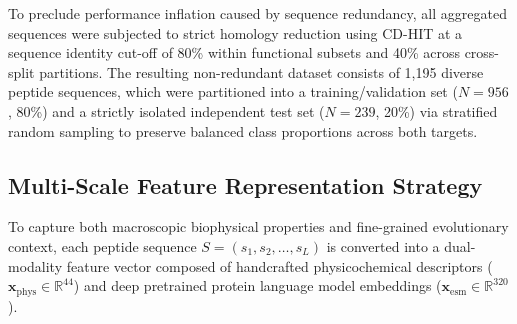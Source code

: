\documentclass[11pt,a4paper]{article}
\begin{document}
To preclude performance inflation caused by sequence redundancy, all aggregated sequences were subjected to strict homology reduction using CD-HIT \cite{fu2012cdhit} at a sequence identity cut-off of 80\% within functional subsets and 40\% across cross-split partitions. The resulting non-redundant dataset consists of 1,195 diverse peptide sequences, which were partitioned into a training/validation set ($N = 956$, 80\%) and a strictly isolated independent test set ($N = 239$, 20\%) via stratified random sampling to preserve balanced class proportions across both targets.

\subsection{Multi-Scale Feature Representation Strategy}
To capture both macroscopic biophysical properties and fine-grained evolutionary context, each peptide sequence $S = (s_1, s_2, \dots, s_L)$ is converted into a dual-modality feature vector composed of handcrafted physicochemical descriptors ($\mathbf{x}_{\text{phys}} \in \mathbb{R}^{44}$) and deep pretrained protein language model embeddings ($\mathbf{x}_{\text{esm}} \in \mathbb{R}^{320}$).
\end{document}

